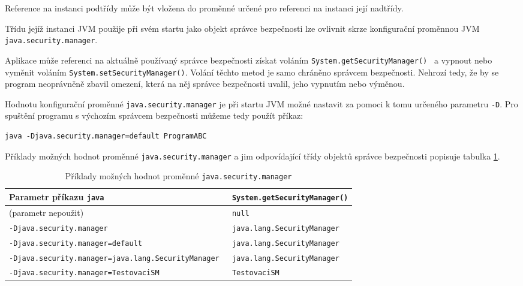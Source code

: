 Reference na instanci podtřídy může být vložena do proměnné určené pro referenci na instanci její nadtřídy.

Třídu jejíž instanci JVM použije při svém startu jako objekt správce bezpečnosti lze ovlivnit skrze konfigurační proměnnou JVM {\tt java.security.manager}.

Aplikace může referenci na aktuálně používaný správce bezpečnosti získat voláním {\tt System.getSecurityManager() } a vypnout nebo vyměnit voláním {\tt System.setSecurityManager()}. Volání těchto metod je samo chráněno správcem bezpečnosti. Nehrozí tedy, že by se program neoprávněně zbavil omezení, která na něj správce bezpečnosti uvalil, jeho vypnutím nebo výměnou.

Hodnotu konfigurační proměnné {\tt java.security.manager} je při startu JVM možné nastavit za pomoci k tomu určeného parametru {\tt -D}. Pro spuštění programu s výchozím správcem bezpečnosti můžeme tedy použít příkaz:

\begin{lstlisting}[caption=Příkaz spouštějící program s výchozím správcem bezpečnosti, label=smEx]
java -Djava.security.manager=default ProgramABC
\end{lstlisting}

Příklady možných hodnot proměnné {\tt java.security.manager} a jim odpovídající třídy objektů správce bezpečnosti popisuje tabulka \ref{tabulkaParametruJavy}.

\begin{table}[tb]
\label{tabulkaParametruJavy}
\begin{center}
    \begin{tabular}{| l | l |}
    \hline
    Parametr příkazu {\tt java}                              & {\tt System.getSecurityManager()} \\ \hline
    (parametr nepoužit)                                      & {\tt null                       } \\
    {\tt -Djava.security.manager                           } & {\tt java.lang.SecurityManager  } \\
    {\tt -Djava.security.manager=default                   } & {\tt java.lang.SecurityManager  } \\
    {\tt -Djava.security.manager=java.lang.SecurityManager } & {\tt java.lang.SecurityManager  } \\
    {\tt -Djava.security.manager=TestovaciSM               } & {\tt TestovaciSM                } \\
    \hline
    \end{tabular}
\end{center}
\caption{Příklady možných hodnot proměnné {\tt java.security.manager}}
\end{table}

